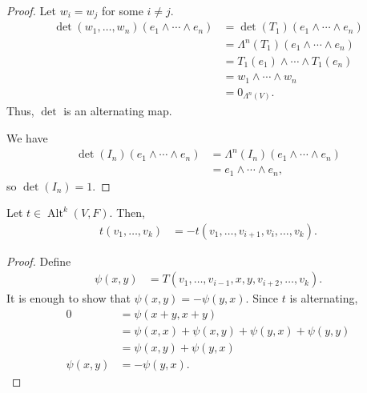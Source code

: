 \documentclass[10pt]{mypackage}
\begin{document}
\begin{proof}
      Let $w_i = w_j$ for some $i\neq j$.
      \begin{align*}
        \det\left(w_1,\dots,w_n\right)\left(e_1\wedge\cdots \wedge e_n\right) &= \det\left(T_1\right)\left(e_1\wedge\cdots\wedge e_n\right)\\
                                                                              &= \Lambda^{n}\left(T_1\right)\left(e_1\wedge\cdots\wedge e_n\right)\\
                                                                              &= T_1\left(e_1\right)\wedge\cdots\wedge T_1\left(e_n\right)\\
                                                                              &= w_1\wedge\cdots\wedge w_n\\
                                                                              &= 0_{\Lambda^{n}\left(V\right)}.
      \end{align*}
      Thus, $\det$ is an alternating map.\newline

      We have
      \begin{align*}
        \det\left(I_n\right)\left(e_1\wedge\cdots\wedge e_n\right) &= \Lambda^{n}\left(I_n\right)\left(e_1\wedge\cdots\wedge e_n\right)\\
                                                                   &= e_1\wedge\cdots\wedge e_n,
      \end{align*}
      so $\det\left(I_n\right) = 1$.
    \end{proof}
    \begin{lemma}
      Let $t\in \operatorname{Alt}^{k}\left(V,F\right)$. Then,
      \begin{align*}
        t\left(v_1,\dots,v_k\right) &= -t\left(v_{1},\dots,v_{i+1},v_{i},\dots,v_{k}\right).
      \end{align*}
    \end{lemma}
    \begin{proof}
      Define
      \begin{align*}
        \psi\left(x,y\right) &= T\left(v_1,\dots,v_{i-1},x,y,v_{i+2},\dots,v_{k}\right).
      \end{align*}
      It is enough to show that $\psi\left(x,y\right) = -\psi\left(y,x\right)$. Since $t$ is alternating,
      \begin{align*}
        0 &= \psi\left(x+y,x+y\right)\\
          &= \psi\left(x,x\right) + \psi\left(x,y\right) + \psi\left(y,x\right) + \psi\left(y,y\right)\\
          &= \psi\left(x,y\right) + \psi\left(y,x\right)\\
        \psi\left(x,y\right) &= -\psi\left(y,x\right).
      \end{align*}
    \end{proof}
\end{document}
